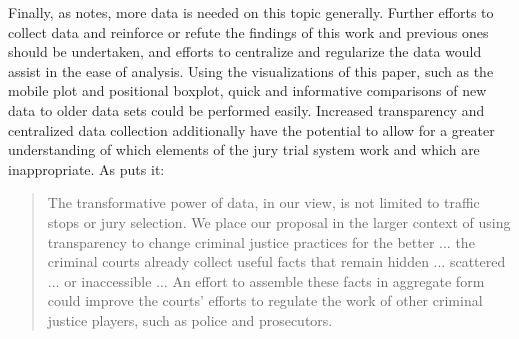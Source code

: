 Finally, as \cite{JurySunshineProj} notes, more data is needed on this topic generally. Further efforts to collect data and
reinforce or refute the findings of this work and previous ones should be undertaken, and efforts to centralize and regularize the
data would assist in the ease of analysis. Using the visualizations of
this paper, such as the mobile plot and positional boxplot, quick and
informative comparisons of new data to older data sets could be
performed easily. Increased transparency and
centralized data collection additionally have the potential to allow for a greater understanding of which elements of the jury
trial system work and which are inappropriate. As \citeauthor{JurySunshineProj} puts it:

\begin{quote}
  The transformative power of data, in our view, is not limited to traffic stops or jury selection. We place our proposal in the
  larger context of using transparency to change criminal justice
  practices for the better ... the
  criminal courts already collect useful facts that remain hidden ... scattered ... or inaccessible
  ... An effort to assemble these facts in aggregate form could improve the courts' efforts to regulate the work of other
  criminal justice players, such as police and prosecutors.
\end{quote}

